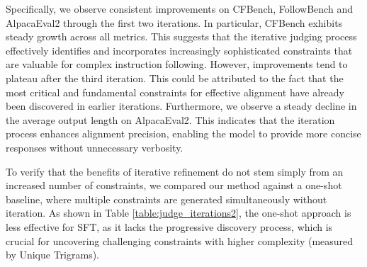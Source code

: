 

Specifically, we observe consistent improvements on CFBench, FollowBench and AlpacaEval2 through the first two iterations. In particular, CFBench exhibits steady growth across all metrics. This suggests that the iterative judging process effectively identifies and incorporates increasingly sophisticated constraints that are valuable for complex instruction following. However, improvements tend to plateau after the third iteration. This could be attributed to the fact that the most critical and fundamental constraints for effective alignment have already been discovered in earlier iterations. Furthermore, we observe a steady decline in the average output length on AlpacaEval2. This indicates that the iteration process enhances alignment precision, enabling the model to provide more concise responses without unnecessary verbosity.

To verify that the benefits of iterative refinement do not stem simply from an increased number of constraints, we compared our method against a one-shot baseline, where multiple constraints are generated simultaneously without iteration. As shown in Table \ref{table:judge_iterations2}, the one-shot approach is less effective for SFT, as it lacks the progressive discovery process, which is crucial for uncovering challenging constraints with higher complexity (measured by Unique Trigrams).




